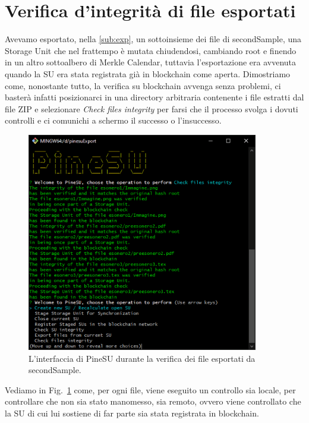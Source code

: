 \section{Verifica d’integrità di file esportati}
Avevamo esportato, nella \autoref{sub:exp}, un sottoinsieme dei file di \textsf{secondSample},
una Storage Unit che nel frattempo è mutata chiudendosi, cambiando root e finendo in un
altro sottoalbero di Merkle Calendar, tuttavia l’esportazione era avvenuta quando la SU
era stata registrata già in blockchain come aperta.
Dimostriamo come, nonostante tutto, la verifica su blockchain avvenga senza problemi,
ci basterà infatti posizionarci in una directory arbitraria contenente i file estratti
dal file ZIP e selezionare \emph{Check files integrity} per farsi che il processo svolga i
dovuti controlli e ci comunichi a schermo il successo o l’insuccesso.

\begin{figure}[H]
    \centering
    \includegraphics[width=0.9\textwidth]{Figures/verifyFiles}
    \caption{\small{
    L’interfaccia di PineSU durante la verifica dei file esportati da \textsf{secondSample}.
    } %
    } %
    \label{fi:vfil}
\end{figure}

Vediamo in Fig.~\ref{fi:vfil} come, per ogni file, viene eseguito un controllo sia locale,
per controllare che non sia stato manomesso, sia remoto, ovvero viene controllato che la SU
di cui lui sostiene di far parte sia stata registrata in blockchain.
